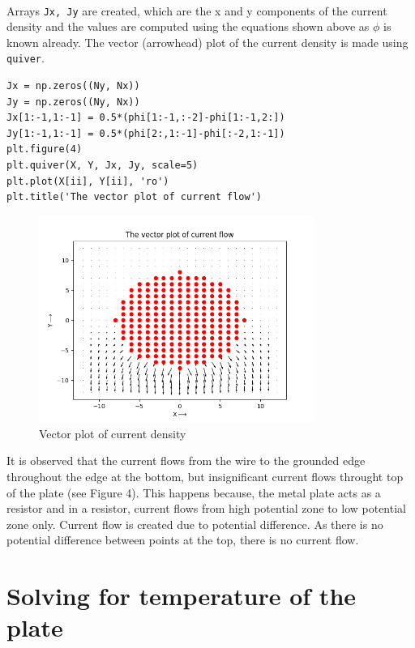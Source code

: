 \documentclass[12pt, a4paper]{article}
\begin{document}
\paragraph*{}
Arrays \texttt{Jx, Jy} are created, which are the x and y components of the current density and the values are computed using the equations shown above as $\phi$ is known already. The vector (arrowhead) plot of the current density is made using \texttt{quiver}. 

\begin{lstlisting}
Jx = np.zeros((Ny, Nx))
Jy = np.zeros((Ny, Nx))
Jx[1:-1,1:-1] = 0.5*(phi[1:-1,:-2]-phi[1:-1,2:])
Jy[1:-1,1:-1] = 0.5*(phi[2:,1:-1]-phi[:-2,1:-1])
plt.figure(4)
plt.quiver(X, Y, Jx, Jy, scale=5)
plt.plot(X[ii], Y[ii], 'ro')
plt.title('The vector plot of current flow')
\end{lstlisting}

\begin{figure}[H]
\centering
\includegraphics[width=0.8\textwidth]{Figure_4.png}
\caption{Vector plot of current density}
\end{figure}

It is observed that the current flows from the wire to the grounded edge throughout the edge at the bottom, but insignificant current flows throught top of the plate (see Figure 4). This happens because, the metal plate acts as a resistor and in a resistor, current flows from high potential zone to low potential zone only. Current flow is created due to potential difference. As there is no potential difference between points at the top, there is no current flow.

\section{Solving for temperature of the plate}
\end{document}
